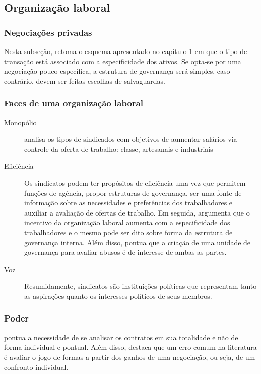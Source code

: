 \subsection*{Organização laboral}

\subsubsection*{Negociações privadas}

Nesta subseção, \autor retoma o esquema apresentado no capítulo 1 em que o tipo de transação está associado com a especificidade dos ativos. Se opta-se por uma negociação pouco específica, a estrutura de governança será simples, caso contrário, devem ser feitas escolhas de salvaguardas.

\subsubsection*{Faces de uma organização laboral}

\begin{description}
	\item[Monopólio] \autor analisa os tipos de sindicados com objetivos de aumentar salários via controle da oferta de trabalho: classe, artesanais e industriais
	\item[Eficiência] Os sindicatos podem ter propósitos de eficiência uma vez que permitem funções de agência, propor estruturas de governança, ser uma fonte de informação sobre as necessidades e preferências dos trabalhadores e auxiliar a avaliação de ofertas de trabalho. Em seguida, argumenta que o incentivo da organização laboral aumenta com a especificidade dos trabalhadores e o mesmo pode ser dito sobre forma da estrutura de governança interna. Além disso, pontua que a criação de uma unidade de governança para avaliar abusos é de interesse de ambas as partes.
	\item[Voz] Resumidamente, sindicatos são instituições políticas que representam tanto as aspirações quanto os interesses políticos de seus membros.
\end{description}

\subsubsection*{Poder}

\autor pontua a necessidade de se analisar os contratos em sua totalidade e não de forma individual e pontual. Além disso, destaca que um erro comum na literatura é avaliar o jogo de formas a partir dos ganhos de uma negociação, ou seja, de um confronto individual.

